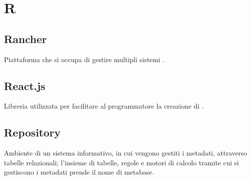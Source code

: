 \section*{R}
\markright{}

\subsection*{Rancher}
Piattaforma che si occupa di gestire multipli sistemi .

\subsection*{React.js}
Libreria  utilizzata per facilitare al programmatore la creazione di .

\subsection*{Repository}
Ambiente di un sistema informativo, in cui vengono gestiti i metadati, attraverso tabelle relazionali; l'insieme di tabelle, regole e motori di calcolo tramite cui si gestiscono i metadati prende il nome di metabase.  

